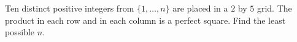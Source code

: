 Ten distinct positive integers from $\{1,\ldots,n\}$ are placed in a $2$ by $5$ grid. The product in each row and in each column is a perfect square. Find the least possible $n$.
